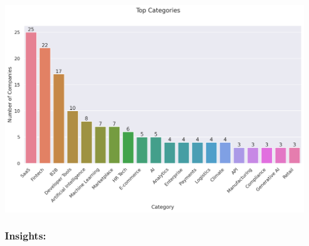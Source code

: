 \documentclass[a4paper,12pt]{article}
\begin{document}
\begin{center}
\includegraphics[width=.9\linewidth]{./.ob-jupyter/038202528157615adc5749cf333224cbea45b3c9.png}
\label{}
\end{center}

\subsubsection*{Insights:}
\end{document}
